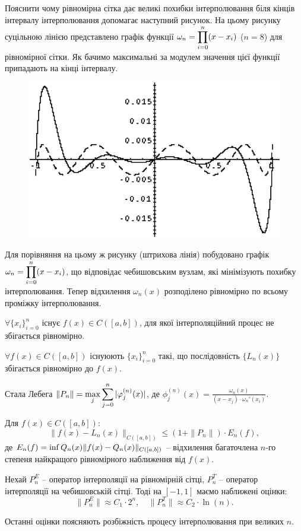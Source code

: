 Пояснити чому рівномірна сітка дає великі похибки інтерполювання біля кінців інтервалу інтерполювання допомагає наступний рисунок. На цьому рисунку суцільною лінією представлено графік функції $\omega_n = \displaystyle\prod\limits_{i=0}^n (x-x_i)$ ($n=8$) для рівномірної сітки. Як бачимо максимальні за модулем значення цієї функції припадають на кінці інтервалу.

\begin{figure}[H]
    \centering
    \includegraphics[width=.5\linewidth]{mal-6.png}
\end{figure}

Для порівняння на цьому ж рисунку (штрихова лінія) побудовано графік $\omega_n = \displaystyle\prod\limits_{i=0}^n (x-x_i)$, що відповідає чебишовським вузлам, які мінімізують похибку інтерполювання. Тепер відхилення $\omega_n(x)$ розподілено рівномірно по всьому проміжку інтерполювання.

\begin{theorem}[Фабера]
    $\forall \{x_i\}_{i=0}^n$ існує $f(x)\in C([a,b])$, для якої інтерполяційний процес не збігається рівномірно.
\end{theorem}

\begin{theorem}[Марцинкевича]
    $\forall f(x) \in C([a,b])$ існуюють $\{x_i\}_{i=0}^n$ такі, що послідовність $\{L_n(x)\}$ збігається рівномірно до $f(x)$.
\end{theorem}

\begin{theorem}
    Стала Лебега $\|P_n\| = \displaystyle\max\limits_{j} \displaystyle\sum\limits_{j=0}^n |\varphi_j^{(n)}(x)|$, де $\phi_j^{(n)}(x) = \frac{\omega_n(x)}{(x-x_j)\cdot\omega_n'(x_i)}$.
\end{theorem}

\begin{theorem}
    Для $f(x)\in C([a,b])$:
    \[\|f(x)-L_n(x)\|_{C([a,b])} \le (1 + \|P_n\|) \cdot E_n(f),\]
    де $E_n(f) = \displaystyle\inf\limits{Q_n(x)} \|f(x)-Q_n(x)\|_{C([a,b])}$ -- відхилення багаточлена $n$-го степеня найкращого рівномірного наближення від $f(x)$.
\end{theorem}

\begin{theorem}
    Нехай $P_n^E$ -- оператор інтерполяції на рівномірній сітці, $P_n^T$ -- оператор інтерполяції на чебишовській сітці. Тоді на $[-1,1]$ маємо наближені оцінки:
    \[ \|P_n^E\|\approx C_1 \cdot 2^n, \quad \|P_n^T\|\approx C_2\cdot \ln(n).\]
\end{theorem}

Останні оцінки поясняють розбіжність процесу інтерполювання при великих $n$.